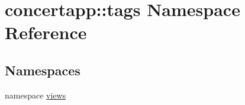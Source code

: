 \hypertarget{namespaceconcertapp_1_1tags}{
\section{concertapp::tags Namespace Reference}
\label{namespaceconcertapp_1_1tags}
}
\subsection*{Namespaces}
\begin{DoxyCompactItemize}
\item 
namespace \hyperlink{namespaceconcertapp_1_1tags_1_1views}{views}
\end{DoxyCompactItemize}
